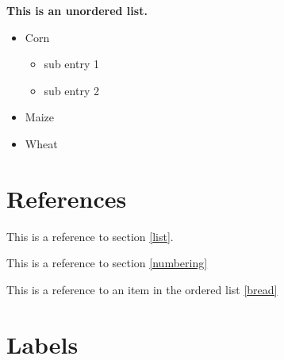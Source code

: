 \documentclass{article}
\begin{document}
\textbf{This is an unordered list.}
\begin{itemize}
\item Corn
\begin {itemize}
\item sub entry 1
\item sub entry 2
\end {itemize}
\item Maize
\item Wheat
\end{itemize}

\section {References}

This is a reference to section \ref{list}.

This is a reference to section \ref{numbering}

This is a reference to an item in the ordered list \ref{bread}


\section {Labels\label{list}}
\end{document}

